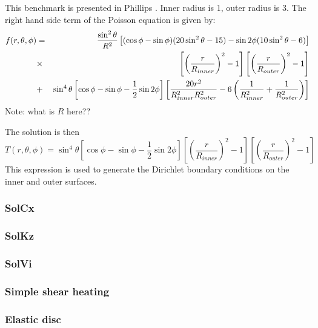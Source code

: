 This benchmark is presented in Phillips \etal \cite{phdo19}. 
Inner radius is 1, outer radius is 3.
The right hand side term of the Poisson equation is given by:
\begin{eqnarray}
f(r,\theta,\phi)&=&
\frac{\sin^2\theta }{R^2} 
\left[
(\cos\phi-\sin\phi)(20\sin^2\theta -15) -\sin 2\phi (10\sin^2 \theta -6)
\right] \nonumber\\
&\times & \left[ \left(\frac{r}{R_{inner}}\right)^2 -1  \right]
\left[ \left(\frac{r}{R_{outer}}\right)^2 -1  \right] \nonumber\\
&+&\sin^4 \theta
\left[ \cos\phi -\sin\phi -\frac12 \sin 2\phi \right]
\left[
\frac{20r^2}{R_{inner}^2R_{outer}^2} -6 \left( \frac{1}{R_{inner}^2}+\frac{1}{R_{outer}^2}  \right)
\right]
\end{eqnarray}
Note: what is $R$ here??

The solution is then 
\[
T(r,\theta,\phi) = \sin^4 \theta \left[ \cos\phi -\sin\phi -\frac12 \sin 2\phi \right]
\left[ \left(\frac{r}{R_{inner}}\right)^2 -1  \right]
\left[ \left(\frac{r}{R_{outer}}\right)^2 -1  \right]
\]
This expression is used to generate the Dirichlet boundary conditions on the inner and outer surfaces.


\subsubsection{SolCx}\label{ss:solcx} 


\subsubsection{SolKz} \label{ss:solkz} 


\subsubsection{SolVi} \label{ss:solvi} 





\subsubsection{Simple shear heating} \label{ss:shearheating} 



\subsubsection{Elastic disc} \label{ss:mms_elasticdisc} 











